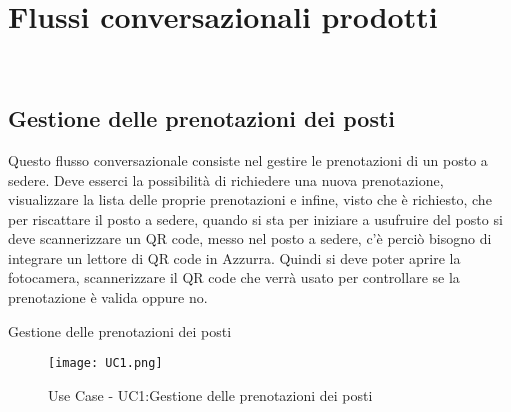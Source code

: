 
\chapter{Flussi conversazionali prodotti}
\label{cap:flussi di conversazione}

\\

\section{Gestione delle prenotazioni dei posti}
Questo flusso conversazionale consiste nel gestire le prenotazioni di un posto a sedere. Deve esserci la possibilità di richiedere una nuova prenotazione, visualizzare la lista delle proprie prenotazioni e infine, visto che è richiesto, che per riscattare il posto a sedere, quando si sta per iniziare a usufruire del posto si deve scannerizzare un QR code, messo nel posto a sedere, c'è perciò bisogno di integrare un lettore di QR code in Azzurra. Quindi si deve poter aprire la fotocamera, scannerizzare il QR code che verrà usato per controllare se la prenotazione è valida oppure no.
\begin{usecase}{1}{Gestione delle prenotazioni dei posti}
	\begin{figure}[h]
		\begin{center}
			\texttt{[image: UC1.png]}
			\caption{Use Case - UC1:Gestione delle prenotazioni dei posti}\label{fig:UC1}
		\end{center}
	\end{figure}
\end{usecase}

